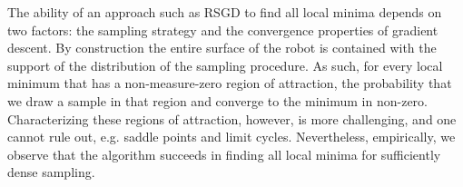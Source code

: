 The ability of an approach such as RSGD to find all local minima depends on two factors: the sampling strategy and the convergence properties of gradient descent. 
By construction the entire surface of the robot is contained with the support of the distribution of the sampling procedure.
As such, for every local minimum that has a non-measure-zero region of attraction, the probability that we draw a sample in that region and converge to the minimum in non-zero.  
Characterizing these regions of attraction, however, is more challenging, and one cannot rule out, e.g. saddle points and limit cycles. 
Nevertheless, empirically, we observe that the algorithm succeeds in finding all local minima for sufficiently dense sampling.

